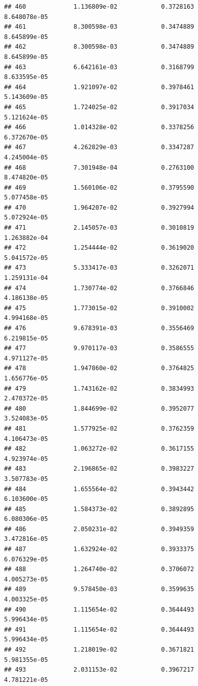 \documentclass[
]{article}
\begin{document}
\begin{verbatim}
## 460             1.136809e-02            0.3728163            8.648078e-05
## 461             8.300598e-03            0.3474889            8.645899e-05
## 462             8.300598e-03            0.3474889            8.645899e-05
## 463             6.642161e-03            0.3168799            8.633595e-05
## 464             1.921097e-02            0.3978461            5.143609e-05
## 465             1.724025e-02            0.3917034            5.121624e-05
## 466             1.014328e-02            0.3378256            6.372670e-05
## 467             4.262829e-03            0.3347287            4.245004e-05
## 468             7.301948e-04            0.2763100            8.474820e-05
## 469             1.560106e-02            0.3795590            5.077458e-05
## 470             1.964207e-02            0.3927994            5.072924e-05
## 471             2.145057e-03            0.3010819            1.263882e-04
## 472             1.254444e-02            0.3619020            5.041572e-05
## 473             5.333417e-03            0.3262071            1.259131e-04
## 474             1.730774e-02            0.3766846            4.186138e-05
## 475             1.773015e-02            0.3910002            4.994168e-05
## 476             9.678391e-03            0.3556469            6.219815e-05
## 477             9.970117e-03            0.3586555            4.971127e-05
## 478             1.947860e-02            0.3764825            1.656776e-05
## 479             1.743162e-02            0.3834993            2.470372e-05
## 480             1.844699e-02            0.3952077            3.524083e-05
## 481             1.577925e-02            0.3762359            4.106473e-05
## 482             1.063272e-02            0.3617155            4.923974e-05
## 483             2.196865e-02            0.3983227            3.507783e-05
## 484             1.655564e-02            0.3943442            6.103600e-05
## 485             1.584373e-02            0.3892895            6.080306e-05
## 486             2.050231e-02            0.3949359            3.472816e-05
## 487             1.632924e-02            0.3933375            6.076329e-05
## 488             1.264740e-02            0.3706072            4.005273e-05
## 489             9.578450e-03            0.3599635            4.003325e-05
## 490             1.115654e-02            0.3644493            5.996434e-05
## 491             1.115654e-02            0.3644493            5.996434e-05
## 492             1.218019e-02            0.3671821            5.981355e-05
## 493             2.031153e-02            0.3967217            4.781221e-05

\end{verbatim}
\end{document}
